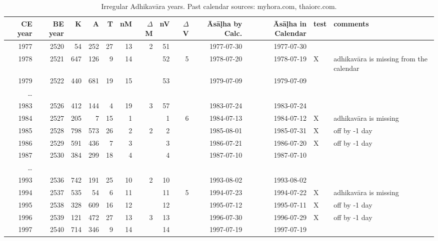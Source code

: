 \documentclass[11pt,oneside]{memoir-article}
\begin{document}
\begin{landscape}
\begin{table}[p]
\caption{\label{tbl-adhikavara-irregularities} Irregular Adhikavāra years. Past calendar sources: myhora.com, thaiorc.com.}
\begin{center}
\begin{tabular}{rrrrrrrrrrrll}
CE year & BE year & K & A & T & nM & $\Delta$ M & nV & $\Delta$ V & Āsāḷha by Calc. & Āsāḷha in Calendar & test & comments\\
\hline
1977 & 2520 & 54 & 252 & 27 & 13 & 2 & 51 &  & 1977-07-30 & 1977-07-30 &  & \\
1978 & 2521 & 647 & 126 & 9 & 14 &  & 52 & 5 & 1978-07-20 & 1978-07-19 & X & adhikavāra is missing from the calendar\\
1979 & 2522 & 440 & 681 & 19 & 15 &  & 53 &  & 1979-07-09 & 1979-07-09 &  & \\
… &  &  &  &  &  &  &  &  &  &  &  & \\
1983 & 2526 & 412 & 144 & 4 & 19 & 3 & 57 &  & 1983-07-24 & 1983-07-24 &  & \\
1984 & 2527 & 205 & 7 & 15 & 1 &  & 1 & 6 & 1984-07-13 & 1984-07-12 & X & adhikavāra is missing\\
1985 & 2528 & 798 & 573 & 26 & 2 & 2 & 2 &  & 1985-08-01 & 1985-07-31 & X & off by -1 day\\
1986 & 2529 & 591 & 436 & 7 & 3 &  & 3 &  & 1986-07-21 & 1986-07-20 & X & off by -1 day\\
1987 & 2530 & 384 & 299 & 18 & 4 &  & 4 &  & 1987-07-10 & 1987-07-10 &  & \\
… &  &  &  &  &  &  &  &  &  &  &  & \\
1993 & 2536 & 742 & 191 & 25 & 10 & 2 & 10 &  & 1993-08-02 & 1993-08-02 &  & \\
1994 & 2537 & 535 & 54 & 6 & 11 &  & 11 & 5 & 1994-07-23 & 1994-07-22 & X & adhikavāra is missing\\
1995 & 2538 & 328 & 609 & 16 & 12 &  & 12 &  & 1995-07-12 & 1995-07-11 & X & off by -1 day\\
1996 & 2539 & 121 & 472 & 27 & 13 & 3 & 13 &  & 1996-07-30 & 1996-07-29 & X & off by -1 day\\
1997 & 2540 & 714 & 346 & 9 & 14 &  & 14 &  & 1997-07-19 & 1997-07-19 &  & \\
\end{tabular}
\end{center}
\end{table}
\end{landscape}
\end{document}
